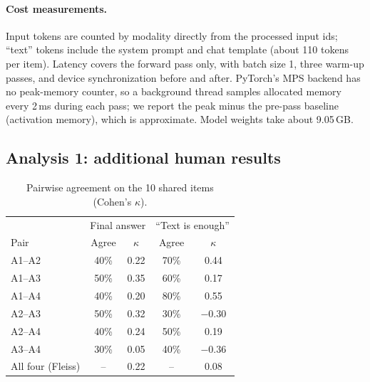 \documentclass{article}
\begin{document}
\paragraph{Cost measurements.} Input tokens are counted by modality directly
from the processed input ids; ``text'' tokens include the system prompt and chat
template (about 110 tokens per item). Latency covers the forward pass only, with
batch size 1, three warm-up passes, and device synchronization before and after.
PyTorch's MPS backend has no peak-memory counter, so a background thread samples
allocated memory every 2\,ms during each pass; we report the peak minus the
pre-pass baseline (activation memory), which is approximate. Model weights take
about 9.05\,GB.

\subsection{Analysis 1: additional human results}
\label{app:a1}

\begin{table}[h]
\caption{Pairwise agreement on the 10 shared items (Cohen's $\kappa$).}
\label{tab:app-pairs}
\centering\small
\begin{tabular}{lcccc}
\toprule
 & \multicolumn{2}{c}{Final answer} & \multicolumn{2}{c}{``Text is enough''} \\
Pair & Agree & $\kappa$ & Agree & $\kappa$ \\
\midrule
A1--A2 & 40\% & 0.22 & 70\% & 0.44 \\
A1--A3 & 50\% & 0.35 & 60\% & 0.17 \\
A1--A4 & 40\% & 0.20 & 80\% & 0.55 \\
A2--A3 & 50\% & 0.32 & 30\% & $-0.30$ \\
A2--A4 & 40\% & 0.24 & 50\% & 0.19 \\
A3--A4 & 30\% & 0.05 & 40\% & $-0.36$ \\
\midrule
All four (Fleiss) & -- & 0.22 & -- & 0.08 \\
\bottomrule
\end{tabular}
\end{table}
\end{document}
